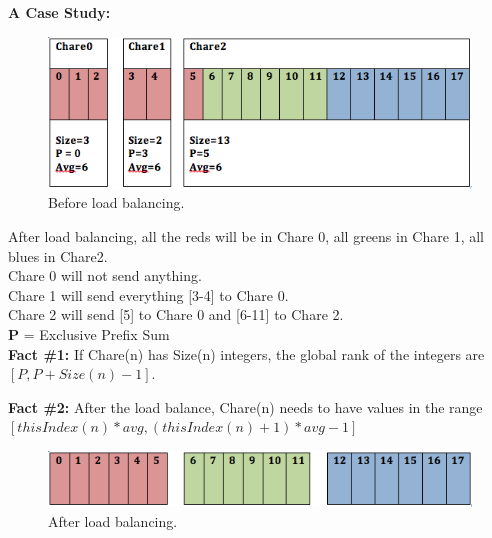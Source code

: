 \documentclass{article}
\begin{document}
\textbf{A Case Study:} 

\begin{figure}[h]
\centering
\includegraphics[width=\textwidth]{before_balance.png}
\caption{Before load balancing.}
\label{prefix}
\end{figure}

After load balancing, all the reds will be in Chare 0, all greens in Chare 1, all blues in Chare2. \\
Chare 0 will not send anything.\\
Chare 1 will send everything [3-4] to Chare 0.\\
Chare 2 will send [5] to Chare 0 and [6-11] to Chare 2.\\

\textbf{P} = Exclusive Prefix Sum \\

\textbf{Fact \#1:}
If Chare(n) has Size(n) integers, the global rank of the integers are $[P, P+Size(n)-1]$.

\textbf{Fact \#2:}
After the load balance, Chare(n) needs to have values in the range 
$[thisIndex(n)*avg, (thisIndex(n)+1)*avg-1]$\\

\begin{figure}[h]
\centering
\includegraphics[width=\textwidth]{after_balance.png}
\caption{After load balancing.}
\label{prefix}
\end{figure}
\end{document}
